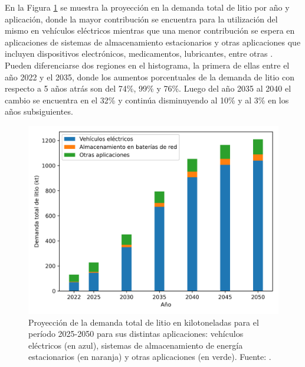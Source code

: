 En la Figura \ref{fig:iea-Li} se muestra la proyección en la demanda total de 
litio por año y aplicación, donde la mayor contribución se encuentra para la 
utilización del mismo en vehículos eléctricos mientras que una menor contribución 
se espera en aplicaciones de sistemas de almacenamiento estacionarios y otras 
aplicaciones que incluyen dispositivos electrónicos, medicamentos, lubricantes, 
entre otras \cite{IEA}. Pueden diferenciarse dos regiones en el histograma, la 
primera de ellas entre el año 2022 y el 2035, donde los aumentos porcentuales de 
la demanda de litio con respecto a 5 años atrás son del 74\%, 99\% y 76\%. Luego
del año 2035 al 2040 el cambio se encuentra en el 32\% y continúa disminuyendo 
al 10\% y al 3\% en los años subsiguientes.
\begin{figure}[h!]
    \centering
    \includegraphics[width=.8\textwidth]{Introduccion/iea-Li.png}
    \caption{Proyección de la demanda total de litio en kilotoneladas para el 
    período 2025-2050 para sus distintas aplicaciones: vehículos eléctricos (en 
    azul), sistemas de almacenamiento de energía estacionarios (en naranja) y
    otras aplicaciones (en verde). Fuente: \cite{IEA}.}
    \label{fig:iea-Li}
\end{figure}

